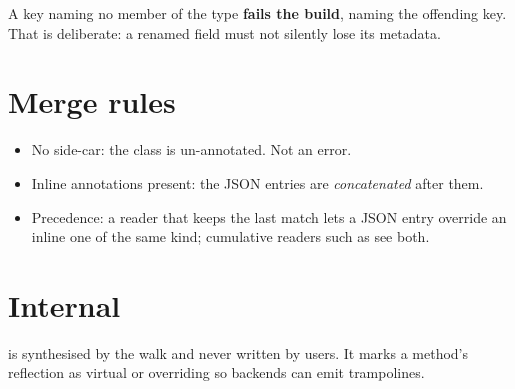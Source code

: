 A key naming no member of the type \textbf{fails the build}, naming the
offending key. That is deliberate: a renamed field must not silently lose its
metadata.

\section{Merge rules}

\begin{itemize}
  \item No side-car: the class is un-annotated. Not an error.
  \item Inline annotations present: the JSON entries are \emph{concatenated}
    after them.
  \item Precedence: a reader that keeps the last match lets a JSON entry
    override an inline one of the same kind; cumulative readers such as
     see both.
\end{itemize}

\section{Internal}

 is synthesised by the walk and never written by
users. It marks a method's reflection as virtual or overriding so backends can
emit trampolines.
